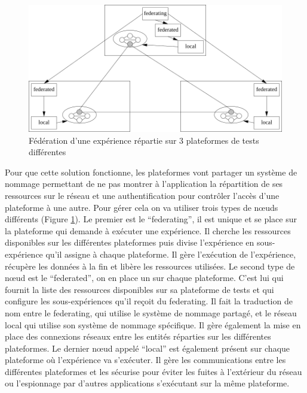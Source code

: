 \begin{figure}
  \centering \includegraphics[scale=0.75]{Pictures/png/Deter_federation}
  \caption{Fédération d'une expérience répartie sur 3 plateformes de tests différentes}
  \label{Federation}
\end{figure}

Pour que cette solution fonctionne, les plateformes vont partager un système de
nommage permettant de ne pas montrer à l'application la répartition de ses
ressources sur le réseau et une authentification pour contrôler l'accès d'une
plateforme à une autre. Pour gérer cela on va utiliser trois types de n\oe uds
différents (Figure \ref{Federation}). Le premier est le ``federating'', il est
unique et se place sur la plateforme qui demande à exécuter une expérience. Il
cherche les ressources disponibles sur les différentes plateformes puis divise
l'expérience en sous-expérience qu'il assigne à chaque plateforme. Il gère
l'exécution de l'expérience, récupère les données à la fin et
libère les ressources utilisées. Le second type de n\oe ud est le ``federated'',
on en place un sur chaque plateforme. C'est lui qui fournit la liste des
ressources disponibles sur sa plateforme de tests et qui configure les
sous-expériences qu'il reçoit du federating. Il fait la traduction de nom entre
le federating, qui utilise le système de nommage partagé, et le réseau local qui
utilise son système de nommage spécifique.  Il gère également la mise en place
des connexions réseaux entre les entités réparties sur les différentes
plateformes. Le dernier n\oe ud appelé ``local'' est également présent sur
chaque plateforme où l'expérience va s'exécuter. Il gère les communications
entre les différentes plateformes et les sécurise pour éviter les fuites à
l'extérieur du réseau ou l'espionnage par d'autres applications s'exécutant sur
la même plateforme.

